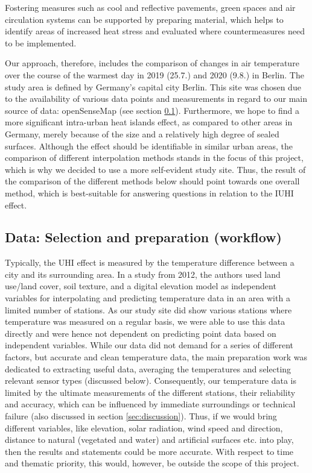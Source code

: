 Fostering measures such as cool and reflective pavements, green spaces and air circulation systems \cite{mohajerani_urban_2017} can be supported by preparing material, which helps to identify areas of increased heat stress and evaluated where countermeasures need to be implemented.

Our approach, therefore, includes the comparison of changes in air temperature over the course of the warmest day in 2019 (25.7.) and 2020 (9.8.) in Berlin. The study area is defined by Germany’s capital city Berlin. This site was chosen due to the availability of various data points and measurements in regard to our main source of data: openSenseMap (see section \ref{sec:data}). Furthermore, we hope to find a more significant intra-urban heat islands effect, as compared to other areas in Germany, merely because of the size and a relatively high degree of sealed surfaces. \cite{gdv_munchen_2018} Although the effect should be identifiable in similar urban areas, the comparison of different interpolation methods stands in the focus of this project, which is why we decided to use a more self-evident study site. Thus, the result of the comparison of the different methods below should point towards one overall method, which is best-suitable for answering questions in relation to the IUHI effect. 

\subsection{Data: Selection and preparation (workflow)}
\label{sec:data}

Typically, the UHI effect is measured by the temperature difference between a city and its surrounding area.\cite{us_epa_learn_2014} In a study from 2012, the authors used land use/land cover, soil texture, and a digital elevation model as independent variables for interpolating and predicting temperature data in an area with a limited number of stations.\cite{samanta_interpolation_2012} As our study site did show various stations where temperature was measured on a regular basis, we were able to use this data directly and were hence not dependent on predicting point data based on independent variables. While our data did not demand for a series of different factors, but accurate and \ldq{}clean\rdq{} temperature data, the main preparation work was dedicated to extracting useful data, averaging the temperatures and selecting relevant sensor types (discussed below). Consequently, our temperature data is limited by the ultimate measurements of the different stations, their reliability and accuracy, which can be influenced by immediate surroundings or technical failure (also discussed in section \ref{sec:discussion}). Thus, if we would bring different variables, like elevation, solar radiation, wind speed and direction, distance to natural (vegetated and water) and artificial surfaces etc. into play, then the results and statements could be more accurate. With respect to time and thematic priority, this would, however, be outside the scope of this project.

